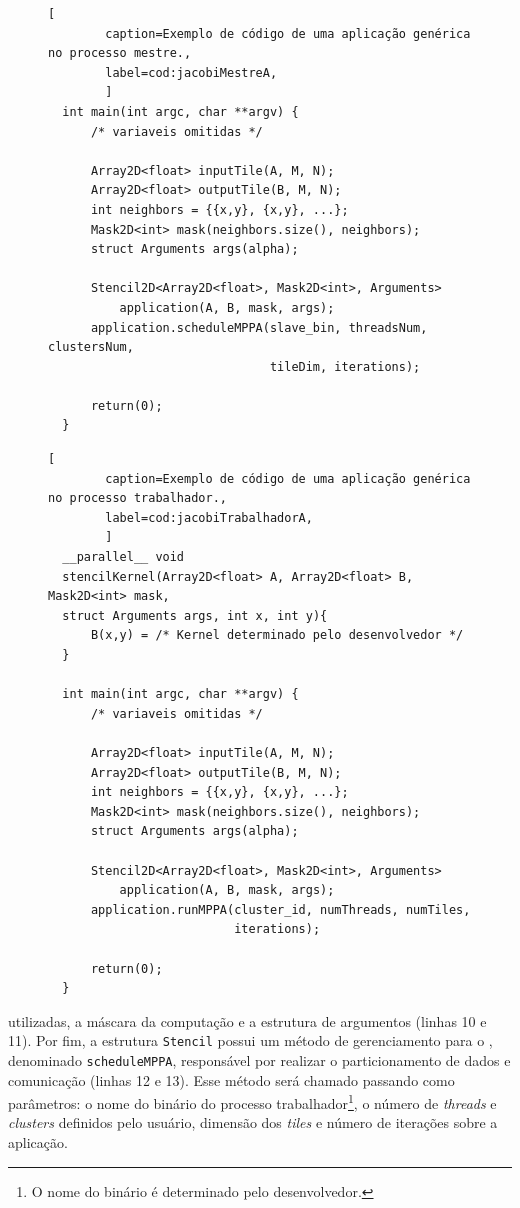\begin{figure}[!h]
    \begin{lstlisting}[
        caption=Exemplo de código de uma aplicação genérica no processo mestre.,
        label=cod:jacobiMestreA,
        ]
  int main(int argc, char **argv) {
      /* variaveis omitidas */

      Array2D<float> inputTile(A, M, N);
      Array2D<float> outputTile(B, M, N);
      int neighbors = {{x,y}, {x,y}, ...};
      Mask2D<int> mask(neighbors.size(), neighbors);
      struct Arguments args(alpha);

      Stencil2D<Array2D<float>, Mask2D<int>, Arguments>
          application(A, B, mask, args);
      application.scheduleMPPA(slave_bin, threadsNum, clustersNum,
                               tileDim, iterations);

      return(0);
  }
    \end{lstlisting}
\end{figure}
\begin{figure}[!h]
    \begin{lstlisting}[
        caption=Exemplo de código de uma aplicação genérica no processo trabalhador.,
        label=cod:jacobiTrabalhadorA,
        ]
  __parallel__ void
  stencilKernel(Array2D<float> A, Array2D<float> B, Mask2D<int> mask,
  struct Arguments args, int x, int y){
      B(x,y) = /* Kernel determinado pelo desenvolvedor */
  }

  int main(int argc, char **argv) {
      /* variaveis omitidas */

      Array2D<float> inputTile(A, M, N);
      Array2D<float> outputTile(B, M, N);
      int neighbors = {{x,y}, {x,y}, ...};
      Mask2D<int> mask(neighbors.size(), neighbors);
      struct Arguments args(alpha);

      Stencil2D<Array2D<float>, Mask2D<int>, Arguments>
          application(A, B, mask, args);
      application.runMPPA(cluster_id, numThreads, numTiles,
                          iterations);

      return(0);
  }
    \end{lstlisting}
\end{figure}

utilizadas, a máscara da computação e a estrutura de argumentos (linhas 10 e 11). Por fim, a
estrutura \texttt{Stencil} possui um método de gerenciamento para o \mppa,
denominado \texttt{scheduleMPPA}, responsável por realizar o particionamento de
dados e comunicação (linhas 12 e 13). Esse método será chamado passando como parâmetros: o nome
do binário do processo trabalhador\footnote{O nome do binário é determinado pelo desenvolvedor.}, o
número de \textit{threads} e \textit{clusters} definidos pelo usuário, dimensão
dos \textit{tiles} e número de iterações sobre a aplicação.


